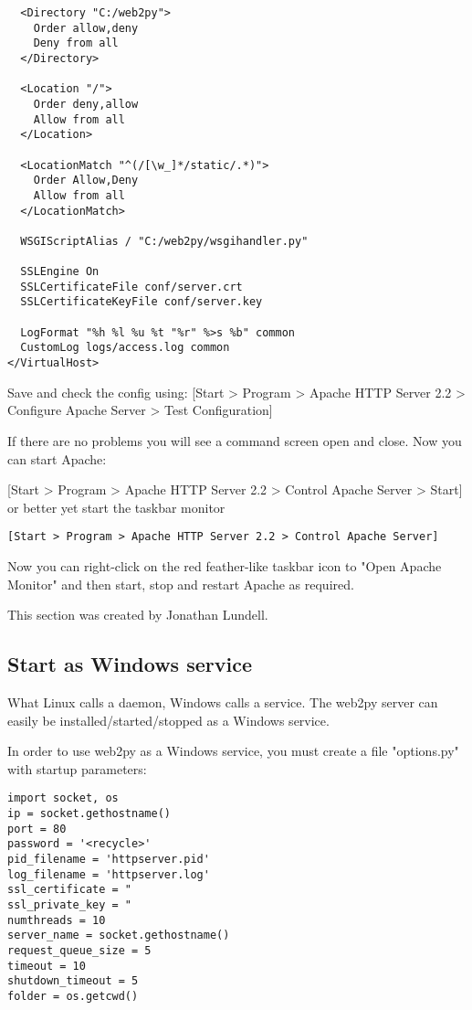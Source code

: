 \documentclass[justified,sixbynine,notoc]{tufte-book}
\def\ft{\small\tt}
\def\inxx#1{\index{#1}}
\begin{document}
\begin{fullwidth}
\begin{lstlisting}
  <Directory "C:/web2py">
    Order allow,deny
    Deny from all
  </Directory>

  <Location "/">
    Order deny,allow
    Allow from all
  </Location>

  <LocationMatch "^(/[\w_]*/static/.*)">
    Order Allow,Deny
    Allow from all
  </LocationMatch>

  WSGIScriptAlias / "C:/web2py/wsgihandler.py"

  SSLEngine On
  SSLCertificateFile conf/server.crt
  SSLCertificateKeyFile conf/server.key

  LogFormat "%h %l %u %t "%r" %>s %b" common
  CustomLog logs/access.log common
</VirtualHost>
\end{lstlisting}

Save and check the config using: [Start > Program > Apache HTTP Server 2.2 > Configure Apache Server > Test Configuration]

If there are no problems you will see a command screen open and close.
Now you can start Apache:

[Start > Program > Apache HTTP Server 2.2 > Control Apache Server > Start]
\noindent or better yet start the taskbar monitor

{\ft [Start > Program > Apache HTTP Server 2.2 > Control Apache Server]}

Now you can right-click on the red feather-like taskbar icon to "Open Apache Monitor" and then start, stop and restart Apache as required.

This section was created by Jonathan Lundell.

\goodbreak\subsection{Start as Windows service}

\inxx{Windows service}

What Linux calls a daemon, Windows calls a service.
The web2py server can easily be installed/started/stopped as a Windows service.

In order to use web2py as a Windows service, you must create a file "options.py"
with startup parameters:
\begin{lstlisting}
import socket, os
ip = socket.gethostname()
port = 80
password = '<recycle>'
pid_filename = 'httpserver.pid'
log_filename = 'httpserver.log'
ssl_certificate = "
ssl_private_key = "
numthreads = 10
server_name = socket.gethostname()
request_queue_size = 5
timeout = 10
shutdown_timeout = 5
folder = os.getcwd()
\end{lstlisting}


\end{fullwidth}
\end{document}
